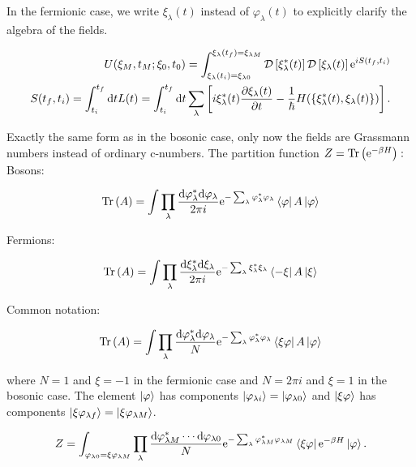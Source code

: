 In the fermionic case, we write $\xi_{\lambda}(t)$ instead of $\varphi_{\lambda}(t)$ to explicitly clarify the algebra of the fields. 

\begin{align*}
    U(\xi_{M} ,t_{M} ; \xi_{0}, t_{0}) = \int_{\xi_{\lambda}(t_{i}) = \xi_{\lambda 0}}^{\xi_{\lambda}(t_{f}) = \xi_{\lambda M}} \mathcal{D} \left[\xi_{\lambda}^{*}(t)\right] \mathcal{D} \left[ \xi_{\lambda} (t)\right] \mathrm{e}^{iS(t_{f}, t_{i})} \\
    S(t_{f}, t_{i}) = \int_{t_{i}}^{t_{f}} \dd t L(t) = \int_{t_{i}}^{t_{f}} \dd t \sum_{\lambda} \left[ i \xi_{\lambda}^{*}(t) \pdv{\xi_{\lambda}(t)}{t} - \frac{1}{\hbar}H(\{\xi_{\lambda}^{*}(t), \xi_{\lambda} (t)\} )  \right].
\end{align*}

Exactly the same form as in the bosonic case, only now the fields are Grassmann numbers instead of ordinary c-numbers. The partition function $Z = \Tr \left( \mathrm{e}^{-\beta H} \right): 
$
Bosons: 

\begin{equation*}
    \Tr \left( A \right) = \int \prod_{\lambda}  \frac{\dd \varphi_{\lambda }^{*} \dd \varphi_{\lambda }}{2\pi i} \mathrm{e}^{-\sum_{\lambda} \varphi_{\lambda}^{*}\varphi_{\lambda}} \bra{\varphi}A \ket{\varphi}
\end{equation*}

Fermions: 

\begin{equation*}
    \Tr \left( A \right) = \int \prod_{\lambda} \frac{\dd \xi_{\lambda }^{*} \dd \xi_{\lambda }}{2\pi i} \mathrm{e}^{-\sum_{\lambda} \xi_{\lambda}^{*}\xi_{\lambda}} \bra{-\xi}A \ket{\xi}
\end{equation*}

Common notation: 

\begin{align*}
    \Tr \left( A \right) = \int \prod_{\lambda}  \frac{\dd \varphi_{\lambda }^{*} \dd \varphi_{\lambda }}{N} \mathrm{e}^{-\sum_{\lambda} \varphi_{\lambda}^{*}\varphi_{\lambda}} \bra{\xi \varphi}A \ket{\varphi}
\end{align*}

where $N = 1$ and $\xi = -1$ in the fermionic case and $N = 2\pi i$ and $\xi = 1$ in the bosonic case. The element $\ket{\varphi}$ has components $\ket{\varphi_{\lambda i}} = \ket{\varphi_{\lambda 0}}$ and $\ket{\xi \varphi}$ has components $\ket{\xi \varphi_{\lambda f}} = \ket{\xi \varphi_{\lambda M}}$. 

\begin{equation*}
    Z = \int_{\varphi_{\lambda 0} = \xi \varphi_{\lambda M}} \prod_{\lambda}  \frac{\dd \varphi_{\lambda M}^{*}  \cdots \dd \varphi_{\lambda 0}}{N} \mathrm{e}^{-\sum_{\lambda} \varphi_{\lambda M}^{*}\varphi_{\lambda M}} \bra{\xi \varphi} \mathrm{e}^{-\beta H} \ket{\varphi}. 
\end{equation*}

